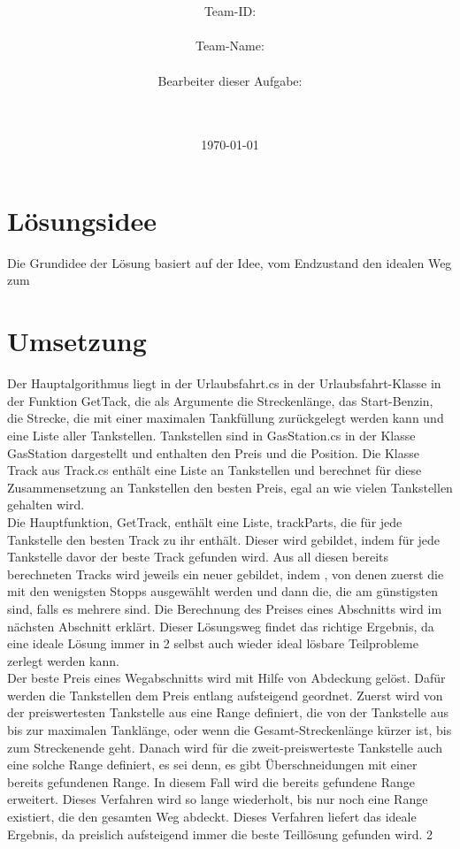 \documentclass[a4paper,10pt,ngerman]{scrartcl}
\title{\textbf{\Huge\Aufgabe}}
\author{\LARGE Team-ID: \LARGE \TeamID \\\\
	    \LARGE Team-Name: \LARGE \TeamName \\\\
	    \LARGE Bearbeiter dieser Aufgabe: \\ 
	    \LARGE \Namen\\\\}
\date{\LARGE\today}
\begin{document}
\maketitle
\tableofcontents

\vspace{0.5cm}

\section{Lösungsidee}
Die Grundidee der Lösung basiert auf der Idee, vom Endzustand den idealen Weg zum 
\section{Umsetzung}
Der Hauptalgorithmus liegt in der Urlaubsfahrt.cs in der Urlaubsfahrt-Klasse in der Funktion GetTack, die als Argumente die Streckenlänge, das Start-Benzin, die Strecke, die mit einer maximalen Tankfüllung zurückgelegt werden kann und eine Liste aller Tankstellen. Tankstellen sind in GasStation.cs in der Klasse GasStation dargestellt und enthalten den Preis und die Position. Die Klasse Track aus Track.cs  enthält eine Liste an Tankstellen und berechnet für diese Zusammensetzung an Tankstellen den besten Preis, egal an wie vielen Tankstellen gehalten wird. \\
Die Hauptfunktion, GetTrack, enthält eine Liste, trackParts, die für jede Tankstelle den besten Track zu ihr enthält. Dieser wird gebildet, indem für jede Tankstelle davor der beste Track gefunden wird. Aus all diesen bereits berechneten Tracks wird jeweils ein neuer gebildet, indem , von denen zuerst die mit den wenigsten Stopps ausgewählt werden und dann die, die am günstigsten sind, falls es mehrere sind. Die Berechnung des Preises eines Abschnitts wird im nächsten Abschnitt erklärt. Dieser Lösungsweg findet das richtige Ergebnis, da eine ideale Lösung immer in 2 selbst auch wieder ideal lösbare Teilprobleme zerlegt werden kann. \\
Der beste Preis eines Wegabschnitts wird mit Hilfe von Abdeckung gelöst. Dafür werden die Tankstellen dem Preis entlang aufsteigend geordnet. Zuerst wird von der preiswertesten Tankstelle aus eine Range definiert, die von der Tankstelle aus bis zur maximalen Tanklänge, oder wenn die Gesamt-Streckenlänge kürzer ist, bis zum Streckenende geht. Danach wird für die zweit-preiswerteste Tankstelle auch eine solche Range definiert, es sei denn, es gibt Überschneidungen mit einer bereits gefundenen Range. In diesem Fall wird die bereits gefundene Range erweitert. Dieses Verfahren wird so lange wiederholt, bis nur noch eine Range existiert, die den gesamten Weg abdeckt. Dieses Verfahren liefert das ideale Ergebnis, da preislich aufsteigend immer die beste Teillösung gefunden wird. 
2
\end{document}
